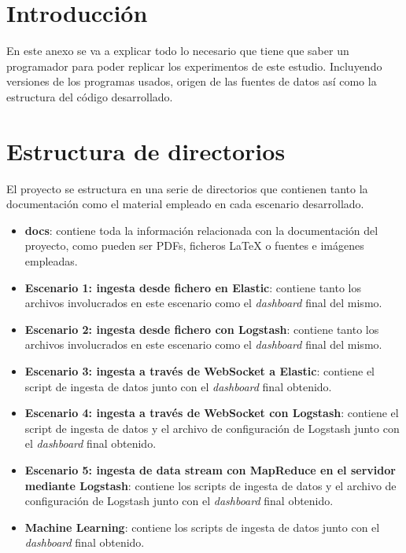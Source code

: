 
\section{Introducción}
En este anexo se va a explicar todo lo necesario que tiene que saber un programador para poder replicar los experimentos de este estudio. Incluyendo versiones de los programas usados, origen de las fuentes de datos así como la estructura del código desarrollado. 

\section{Estructura de directorios}
El proyecto se estructura en una serie de directorios que contienen tanto la documentación como el material empleado en cada escenario desarrollado.
\begin{itemize}
    \item \textbf{docs}: contiene toda la información relacionada con la documentación del proyecto, como pueden ser PDFs, ficheros LaTeX o fuentes e imágenes empleadas.
    \item \textbf{Escenario 1: ingesta desde fichero en Elastic}: contiene tanto los archivos involucrados en este escenario como el \textit{dashboard} final del mismo.
    \item \textbf{Escenario 2: ingesta desde fichero con Logstash}: contiene tanto los archivos involucrados en este escenario como el \textit{dashboard} final del mismo.
    \item \textbf{Escenario 3: ingesta a través de WebSocket a Elastic}: contiene el script de ingesta de datos junto con el \textit{dashboard} final obtenido.
    \item \textbf{Escenario 4: ingesta a través de WebSocket con Logstash}: contiene el script de ingesta de datos y el archivo de configuración de Logstash junto con el \textit{dashboard} final obtenido.
    \item \textbf{Escenario 5: ingesta de data stream con MapReduce en el servidor mediante Logstash}: contiene los scripts de ingesta de datos y el archivo de configuración de Logstash junto con el \textit{dashboard} final obtenido.
    \item \textbf{Machine Learning}: contiene los scripts de ingesta de datos junto con el \textit{dashboard} final obtenido.

\end{itemize}

